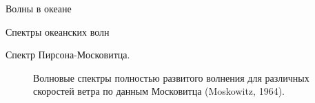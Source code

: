 \begin{chapter}{Волны в океане}
\begin{section}{Спектры океанских волн}
\begin{paragraph}{Спектр Пирсона-Московитца.}
\begin{figure}[t!]
\caption{Волновые спектры полностью развитого волнения для различных скоростей
ветра по данным Московитца (Moskowitz, 1964).}
\label{fig:PMSpectra}
\end{figure}
%
%


\end{paragraph}
\end{section}
\end{chapter}

